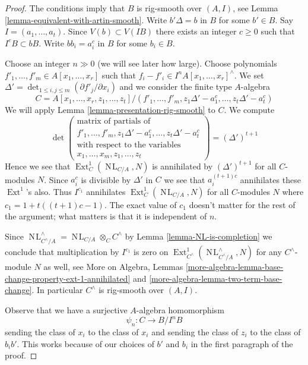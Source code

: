 \documentclass{stacks-project}
\theoremstyle{plain}
\theoremstyle{definition}
\theoremstyle{remark}
\numberwithin{equation}{subsection}
\def\Ext{\mathop{\mathrm{Ext}}\nolimits}
\def\NL{\mathop{N\!L}\nolimits}
\begin{document}
\begin{proof}
The conditions imply that $B$ is rig-smooth over $(A, I)$, see
Lemma \ref{lemma-equivalent-with-artin-smooth}.
Write $b' \Delta = b$ in $B$ for some $b' \in B$.
Say $I = (a_1, \ldots, a_t)$. Since $V(b) \subset V(IB)$ there
exists an integer $c \geq 0$ such that $I^cB \subset bB$.
Write $bb_i = a_i^c$ in $B$ for some $b_i \in B$.

\medskip\noindent
Choose an integer $n \gg 0$ (we will see later how large).
Choose polynomials $f'_1, \ldots, f'_m \in A[x_1, \ldots, x_r]$
such that $f_i - f'_i \in I^nA[x_1, \ldots, x_r]^\wedge$.
We set $\Delta' = \det_{1 \leq i, j \leq m}(\partial f'_j/\partial x_i)$
and we consider the finite type $A$-algebra
$$
C = A[x_1, \ldots, x_r, z_1, \ldots, z_t]/
(f'_1, \ldots, f'_m,
z_1\Delta' - a_1^c, \ldots, z_t\Delta' - a_t^c)
$$
We will apply Lemma \ref{lemma-presentation-rig-smooth} to $C$.
We compute
$$
\det\left(
\begin{matrix}
\text{matrix of partials of} \\
f'_1, \ldots, f'_m, z_1\Delta' - a_1^c, \ldots, z_t\Delta' - a_t^c \\
\text{with respect to the variables} \\
x_1, \ldots, x_m, z_1, \ldots, z_t
\end{matrix}
\right) =
(\Delta')^{t + 1}
$$
Hence we see that $\Ext^1_C(\NL_{C/A}, N)$ is annihilated by
$(\Delta')^{t + 1}$ for all $C$-modules $N$. Since $a_i^c$ is
divisible by $\Delta'$ in $C$ we see that $a_i^{(t + 1)c}$ annihilates
these $\Ext^1$'s also. Thus $I^{c_1}$ annihilates
$\Ext^1_C(\NL_{C/A}, N)$ for all $C$-modules $N$
where $c_1 = 1 + t((t + 1)c - 1)$. The exact value of $c_1$ doesn't matter for
the rest of the argument; what matters is that it is independent of $n$.

\medskip\noindent
Since $\NL_{C^\wedge/A}^\wedge = \NL_{C/A} \otimes_C C^\wedge$ by
Lemma \ref{lemma-NL-is-completion} we conclude that multiplication
by $I^{c_1}$ is zero on $\Ext^1_{C^\wedge}(\NL_{C^\wedge/A}^\wedge, N)$
for any $C^\wedge$-module $N$ as well, see
More on Algebra, Lemmas
\ref{more-algebra-lemma-base-change-property-ext-1-annihilated} and
\ref{more-algebra-lemma-two-term-base-change}.
In particular $C^\wedge$ is rig-smooth over $(A, I)$.

\medskip\noindent
Observe that we have a surjective $A$-algebra homomorphism
$$
\psi_n : C \longrightarrow B/I^nB
$$
sending the class of $x_i$ to the class of $x_i$ and sending the class of
$z_i$ to the class of $b_ib'$. This works because of our choices of $b'$
and $b_i$ in the first paragraph of the proof.


\end{proof}
\end{document}

